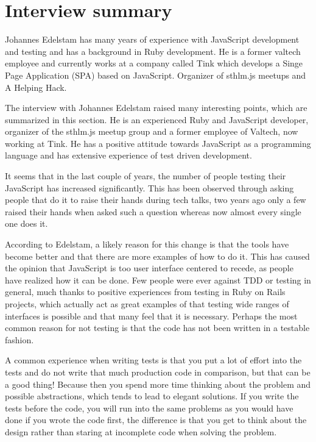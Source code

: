 \documentclass[11pt]{article}
\begin{document}
\section{Interview summary}

Johannes Edelstam has many years of experience with JavaScript development and testing and has a background in Ruby development. He is a former valtech employee and currently works at a company called Tink which develops a Singe Page Application (SPA) based on JavaScript. Organizer of sthlm.js meetups and A Helping Hack.

The interview with Johannes Edelstam raised many interesting points, which are summarized in this section. He is an experienced Ruby and JavaScript developer, organizer of the sthlm.js meetup group and a former employee of Valtech, now working at Tink. He has a positive attitude towards JavaScript as a programming language and has extensive experience of test driven development.

It seems that in the last couple of years, the number of people testing their JavaScript has increased significantly\cite[question~1]{Edelstam}. This has been observed through asking people that do it to raise their hands during tech talks, two years ago only a few raised their hands when asked such a question whereas now almost every single one does it.

According to Edelstam, a likely reason for this change is that the tools have become better and that there are more examples of how to do it. This has caused the opinion that JavaScript is too user interface centered to recede, as people have realized how it can be done. Few people were ever against TDD or testing in general, much thanks to positive experiences from testing in Ruby on Rails projects, which actually act as great examples of that testing wide ranges of interfaces is possible and that many feel that it is necessary. Perhaps the most common reason for not testing is that the code has not been written in a testable fashion. \cite[questions~2-3]{Edelstam}

A common experience when writing tests is that you put a lot of effort into the tests and do not write that much production code in comparison, but that can be a good thing! Because then you spend more time thinking about the problem and possible abstractions, which tends to lead to elegant solutions. If you write the tests before the code, you will run into the same problems as you would have done if you wrote the code first, the difference is that you get to think about the design rather than staring at incomplete code when solving the problem. \cite[question~8]{Edelstam}
\end{document}
